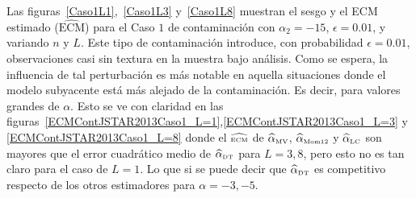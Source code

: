 
Las figuras~\ref{Caso1L1},~\ref{Caso1L3} y~\ref{Caso1L8} muestran el sesgo y el ECM estimado ($\widehat{\text{ECM}}$) para el Caso $1$ de contaminación con $\alpha_2=-15$, $\epsilon=0.01$, y variando $n$ y $L$.  
Este tipo de contaminación introduce, con probabilidad $\epsilon=0.01$, observaciones casi sin textura en la muestra bajo análisis. Como se espera, la influencia de tal perturbación es más notable en aquella situaciones donde el modelo subyacente está más alejado de la contaminación. Es decir, para valores grandes de $\alpha$. Esto se ve con claridad en las figuras~\ref{ECMContJSTAR2013Caso1_L=1},\ref{ECMContJSTAR2013Caso1_L=3} y \ref{ECMContJSTAR2013Caso1_L=8} donde el $\widehat{\text{\tiny{ECM}}}$ de $\widehat\alpha_{\text{\tiny{MV}}}$, $\widehat\alpha_{\text{\tiny{Mom12}}}$ y $\widehat\alpha_{\text{\tiny{LC}}}$ son mayores que el error cuadrático medio de $\widehat\alpha_{\text{\tiny{DT}}}$ para $L=3,8$, pero esto no es tan claro para el caso de $L=1$. Lo que si se puede decir que $\widehat\alpha_{\text{\tiny{DT}}}$ es competitivo respecto de los otros estimadores para $\alpha=-3,-5$.

